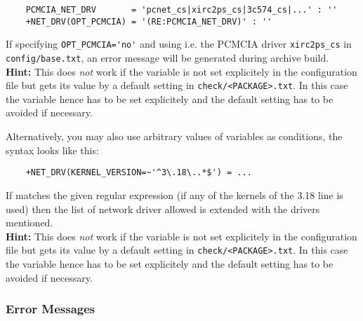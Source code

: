 \begin{example}
\begin{verbatim}
    PCMCIA_NET_DRV       = 'pcnet_cs|xirc2ps_cs|3c574_cs|...' : ''
    +NET_DRV(OPT_PCMCIA) = '(RE:PCMCIA_NET_DRV)' : ''
\end{verbatim}
\end{example}

If specifying \verb+OPT_PCMCIA='no'+  and using i.e. the PCMCIA driver
\texttt{xirc2ps\_cs} in\\ \texttt{config/base.txt}, an error message will
be generated during archive build.\\

\textbf{Hint:} This does \emph{not} work if the variable is not set
explicitely in the configuration file but gets its value by a default
setting in \texttt{check/<PACKAGE>.txt}. In this case the variable hence has
to be set explicitely and the default setting has to be avoided if necessary.


Alternatively, you may also use arbitrary values of variables as conditions,
the syntax looks like this:

\begin{example}
\begin{verbatim}
    +NET_DRV(KERNEL_VERSION=~'^3\.18\..*$') = ...
\end{verbatim}
\end{example}

If  matches the given regular expression (if any of the
kernels of the 3.18 line is used) then the list of network driver allowed is
extended with the drivers mentioned.\\

\textbf{Hint:} This does \emph{not} work if the variable is not set
explicitely in the configuration file but gets its value by a default
setting in \texttt{check/<PACKAGE>.txt}. In this case the variable hence has
to be set explicitely and the default setting has to be avoided if necessary.

\subsubsection{Error Messages}

